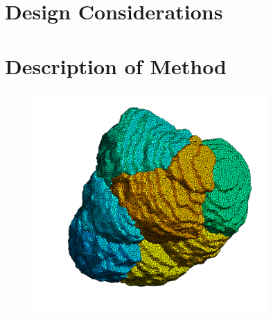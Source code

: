 \documentclass[a4paper,10pt]{article}
\begin{document}
\section{Design Considerations}

\section{Description of Method}

\begin{figure}[H]
\begin{center}
\includegraphics[width=0.8\textwidth]{images/seven_cells_rough_crop.png}
\end{center}
\end{figure}
\end{document}
